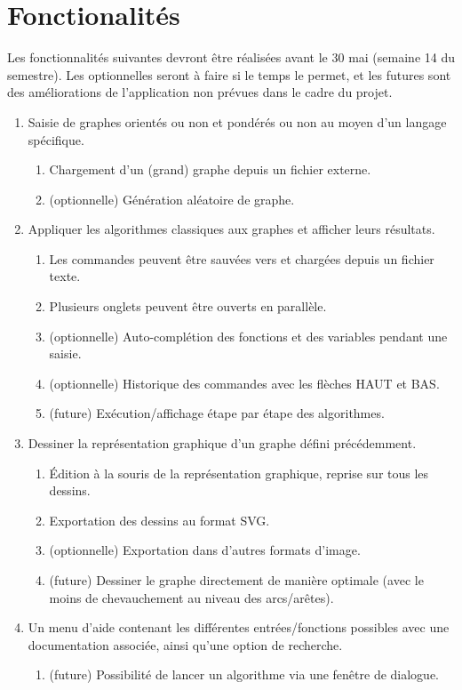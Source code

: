\documentclass[french]{article}
\begin{document}
	\section{Fonctionalités}
		Les fonctionnalités suivantes devront être réalisées avant le 30 mai (semaine 14 du semestre). Les optionnelles seront à faire si le temps le permet, et les futures sont des améliorations de l'application non prévues dans le cadre du projet.
		\begin{enumerate}
			\item Saisie de graphes orientés ou non et pondérés ou non au moyen d'un langage spécifique.
			\begin{enumerate}
				\item Chargement d'un (grand) graphe depuis un fichier externe.
				\item (optionnelle) Génération aléatoire de graphe.
			\end{enumerate}
			
			\item Appliquer les algorithmes classiques aux graphes et afficher leurs résultats.
			\begin{enumerate}
				\item Les commandes peuvent être sauvées vers et chargées depuis un fichier texte.
				\item Plusieurs onglets peuvent être ouverts en parallèle.
				\item (optionnelle) Auto-complétion des fonctions et des variables pendant une saisie.
				\item (optionnelle) Historique des commandes avec les flèches HAUT et BAS.
				\item (future) Exécution/affichage étape par étape des algorithmes.
			\end{enumerate}
			
			\item Dessiner la représentation graphique d'un graphe défini précédemment.
			\begin{enumerate}
				\item Édition à la souris de la représentation graphique, reprise sur tous les dessins.
				\item Exportation des dessins au format SVG.
				\item (optionnelle) Exportation dans d'autres formats d'image.
				\item (future) Dessiner le graphe directement de manière optimale (avec le moins de chevauchement au niveau des arcs/arêtes).
			\end{enumerate}
			
			\item Un menu d'aide contenant les différentes entrées/fonctions possibles avec une documentation associée, ainsi qu'une option de recherche.
			\begin{enumerate}
				\item (future) Possibilité de lancer un algorithme via une fenêtre de dialogue.
			\end{enumerate}
		\end{enumerate}
		
\end{document}
